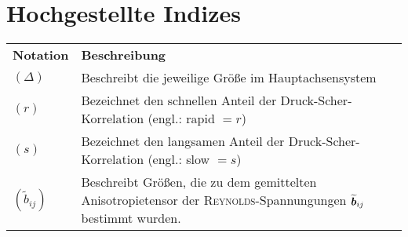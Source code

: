 \section*{Hochgestellte Indizes}
\begin{longtable}{lp{13cm}}
	\textbf{Notation} & \textbf{Beschreibung}\\
	$(\Delta )$ & Beschreibt die jeweilige Größe im Hauptachsensystem\\
	$(r)$ & Bezeichnet den schnellen Anteil der Druck-Scher-Korrelation
	        (engl.: rapid $=r$)\\
	$(s)$ & Bezeichnet den langsamen Anteil der Druck-Scher-Korrelation
        (engl.: slow $=s$)\\
	$\left(\widetilde{b}_{ij}\right)$ & Beschreibt Größen, die zu dem
		gemittelten Anisotropietensor der
		\textsc{Reynolds}-Spannungungen $\widetilde{\bm{b}}_{ij}$
		bestimmt wurden.
\end{longtable}
%
\addtocounter{table}{-5}
